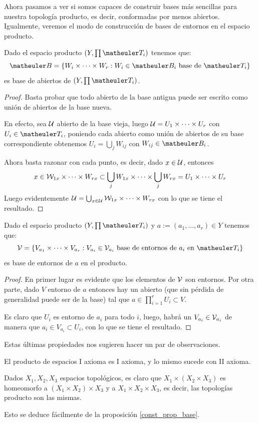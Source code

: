 Ahora pasamos a ver si somos capaces de construir bases más sencillas para nuestra topología producto, es decir, conformadas por menos abiertos. Igualmente, veremos el modo de construcción de bases de entornos en el espacio producto. \begin{prop}
	\label{const_prop_base}
	Dado el espacio producto $(Y,\prod\T_i)$ tenemos que: \[\B=\{W_i\times\cdots\times W_r:W_i\in \B_i \text{ base de }\T_i\}\] es base de abiertos de $(Y,\prod\T_i)$.
\end{prop}
	\begin{proof}
		Basta probar que todo abierto de la base antigua puede ser escrito como unión de abiertos de la base nueva.
		
		En efecto, sea $\mathcal{U}$ abierto de la base vieja, luego $\mathcal{U} =U_1 \times \dots \times U_r $ con $U_i \in \T_i$, poniendo cada abierto como unión de abiertos de su base correspondiente obtenemos $U_i = \bigcup_j W_{ij}$ con $W_{ij} \in \B_i$.
		
		Ahora basta razonar con cada punto, es decir, dado $x \in \mathcal{U}$, entonces \[x \in \mathcal{W}_{1x} \times \dots \times W_{rx} \subset \bigcup_j W_{1x} \times \dots \times \bigcup_j W_{rx} = U_1 \times \dots \times U_r\]	
		Luego evidentemente $\mathcal{U}=\bigcup_{x\in\mathcal{U}}\mathcal{W}_{1x} \times \dots \times W_{rx}$ con lo que se tiene el resultado.
	\end{proof}
\begin{prop}
	Dado el espacio producto $(Y,\prod\T_i)$ y $a:=(a_1,\dots,a_r)\in Y$ tenemos que: \[\V=\{V_{a_1}\times\cdots\times V_{a_r}:V_{a_i}\in \V_{a_i} \text{ base de entornos de $a_i$ en } \T_i\} \] es base de entornos de $a$ en el producto.
\end{prop}
\begin{proof}
	En primer lugar es evidente que los elementos de $\mathcal{V}$ son entornos. Por otra parte, dado $V$ entorno de $a$ entonces hay un abierto (que sin pérdida de generalidad puede ser de la base) tal que $a\in\prod_{i=1}^rU_i\subset V$.
	
	Es claro que $U_i$ es entorno de $a_i$ para todo $i$, luego, habrá un $V_{a_i}\in\mathcal{V}_{a_i}$ de manera que $a_i\in V_{a_i}\subset U_i$, con lo que se tiene el resultado.
\end{proof}
Estas últimas propiedades nos sugieren hacer un par de observaciones.
\begin{obs}
	El producto de espacios I axioma es I axioma, y lo mismo sucede con II axioma.
\end{obs}
\begin{obs}[Asociatividad]
	Dados $X_1,X_2,X_3$ espacios topológicos, es claro que $X_1\times(X_2\times X_3)$ es homeomorfo a $(X_1\times X_2)\times X_3$ y a $X_1\times X_2\times X_3$, es decir, las topologías producto son las mismas.
	
	Esto se deduce fácilmente de la proposición \ref{const_prop_base}.
\end{obs}
